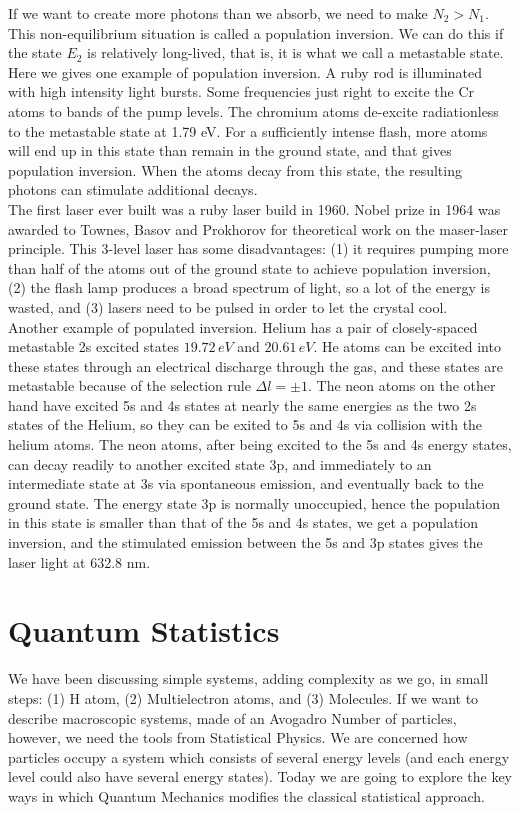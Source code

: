\documentclass[11pt]{article}
\theoremstyle{break}
\theoremstyle{break}
\begin{document}
If we want to create more photons than we absorb, we need to make $N_2 > N_1$. This non-equilibrium situation is called a population inversion. We can do this if the state $E_2$ is relatively long-lived, that is, it is what we call a metastable state.\\

Here we gives one example of population inversion. A ruby rod is illuminated with high intensity light bursts. Some frequencies just right to excite the Cr atoms to bands of the pump levels. The chromium atoms de-excite radiationless to the metastable state at 1.79 eV. For a sufficiently intense flash, more atoms will end up in this state than remain in the ground state, and that gives population inversion.  When the atoms decay from this state, the resulting photons can stimulate additional decays. \\

The first laser ever built was a ruby laser build in 1960. Nobel prize in 1964 was awarded to Townes, Basov and Prokhorov for theoretical work on the maser-laser principle. This 3-level laser has some disadvantages: (1) it requires pumping more than half of the atoms out of the ground state to achieve population inversion, (2) the flash lamp produces a broad spectrum of light, so a lot of the energy is wasted, and (3) lasers need to be pulsed in order to let the crystal cool.\\

Another example of populated inversion. Helium has a pair of closely-spaced metastable 2s excited states $19.72\, eV$ and $20.61\, eV$. He atoms can be excited into these states through an electrical discharge through the gas, and these states are metastable because of the selection rule $\Delta l = \pm 1$. The neon atoms on the other hand have excited 5s and 4s states at
nearly the same energies as the two 2s states of the Helium, so they can be exited to 5s and 4s via collision with the helium atoms. The neon atoms, after being excited to the 5s and 4s energy states, can decay
readily to another excited state 3p, and immediately to an intermediate state at 3s via spontaneous emission, and eventually back to the ground state. The energy state 3p is normally unoccupied, hence the population in this state is smaller than that of the 5s and 4s states, we get a population inversion, and the stimulated emission between the 5s and 3p states gives the laser light at 632.8 nm.\\


\newpage
\section{Quantum Statistics}
We have been discussing simple systems, adding complexity as we go, in small steps: (1) H atom, (2) Multielectron atoms, and (3) Molecules. If we want to describe macroscopic systems, made of an Avogadro Number of particles, however, we need the tools from Statistical Physics. We are concerned how particles occupy a system which consists of several energy levels (and each energy level could also have several energy states). Today we are going to explore the key ways in which Quantum Mechanics modifies the classical statistical approach.\\
\end{document}
